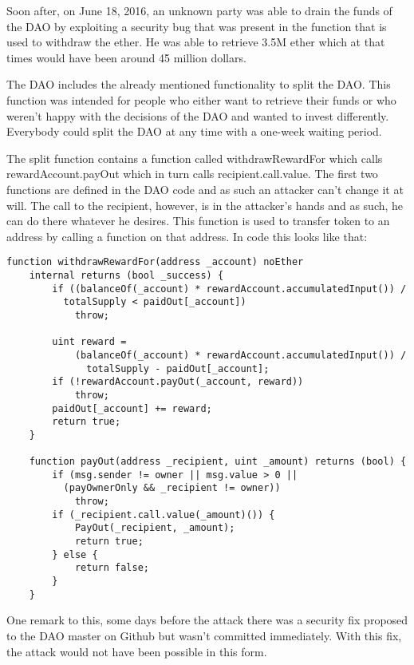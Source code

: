 \documentclass[a4paper, 11pt]{scrartcl}
\begin{document}
Soon after, on June 18, 2016, an unknown party was able to drain the funds of the DAO by exploiting a security bug that was present in the function that is used to withdraw the ether.
He was able to retrieve 3.5M ether which at that times would have been around 45 million dollars.

The DAO includes the already mentioned functionality to split the DAO.
This function was intended for people who either want to retrieve their funds or who weren't happy with the decisions of the DAO and wanted to invest differently.
Everybody could split the DAO at any time with a one-week waiting period.

The split function contains a function called withdrawRewardFor which calls rewardAccount.payOut which in turn calls \textunderscore recipient.call.value. The first two functions are defined in the DAO code and as such an attacker can't change it at will. The call to the recipient, however, is in the attacker's hands and as such, he can do there whatever he desires. This function is used to transfer token to an address by calling a function on that address. In code this looks like that: \cite{deconstructingDaoAttack}

\begin{lstlisting}[language=Solidity]
  function withdrawRewardFor(address _account) noEther 
    internal returns (bool _success) {
        if ((balanceOf(_account) * rewardAccount.accumulatedInput()) /
          totalSupply < paidOut[_account])
            throw;

        uint reward =
            (balanceOf(_account) * rewardAccount.accumulatedInput()) /
              totalSupply - paidOut[_account];
        if (!rewardAccount.payOut(_account, reward))
            throw;
        paidOut[_account] += reward;
        return true;
    }

    function payOut(address _recipient, uint _amount) returns (bool) {
        if (msg.sender != owner || msg.value > 0 ||
          (payOwnerOnly && _recipient != owner))
            throw;
        if (_recipient.call.value(_amount)()) {
            PayOut(_recipient, _amount);
            return true;
        } else {
            return false;
        }
    }
\end{lstlisting}

One remark to this, some days before the attack there was a security fix proposed to the DAO master on Github but wasn't committed immediately. With this fix, the attack would not have been possible in this form. \cite{securityFixPayout}
\end{document}
